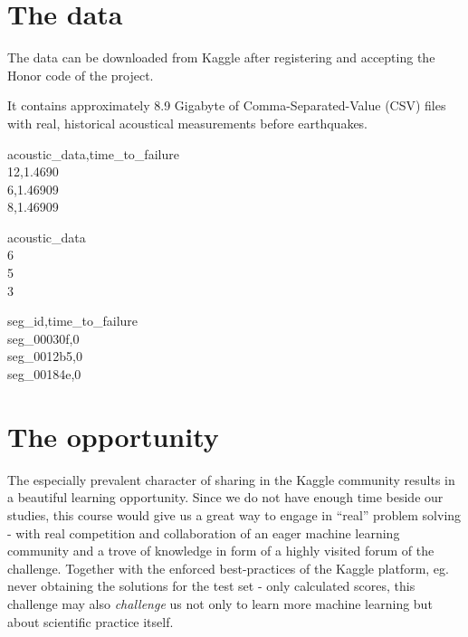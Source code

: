 \documentclass[colorback,accentcolor=tud9c,12pt]{tudreport}
\begin{document}
	\section{The data}
	The data can be downloaded from Kaggle after registering and accepting the Honor code of the project.
	
	It contains approximately 8.9 Gigabyte of Comma-Separated-Value (CSV) files with real, historical acoustical measurements before earthquakes.
		
	\vspace{5mm}
	
	\begin{minipage}[b]{0.33333\textwidth}
		acoustic\_data,time\_to\_failure\\
		12,1.4690\\
		6,1.46909\\
		8,1.46909
	\end{minipage}%
	\begin{minipage}[b]{0.33333\textwidth}
		acoustic\_data\\
		6\\
		5\\
		3
	\end{minipage}%
	\begin{minipage}[b]{0.33333\textwidth}
		seg\_id,time\_to\_failure\\
		seg\_00030f,0\\
		seg\_0012b5,0\\
		seg\_00184e,0
	\end{minipage}%
	
	\section{The opportunity}
	The especially prevalent character of sharing in the Kaggle community results in a beautiful learning opportunity. Since we do not have enough time beside our studies, this course would give us a great way to engage in ``real'' problem solving - with real competition and collaboration of an eager machine learning community and a trove of knowledge in form of a highly visited forum of the challenge.
	Together with the enforced best-practices of the Kaggle platform, eg. never obtaining the solutions for the test set - only calculated scores, this challenge may also \textit{challenge} us not only to learn more machine learning but about scientific practice itself.
	
	
\end{document}
